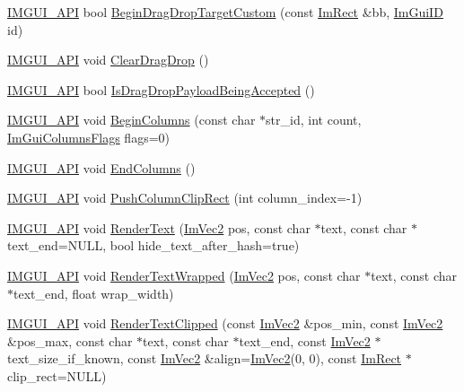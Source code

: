 \begin{DoxyCompactItemize}
\item 
\mbox{\hyperlink{imgui_8h_a43829975e84e45d1149597467a14bbf5}{I\+M\+G\+U\+I\+\_\+\+A\+PI}} bool \mbox{\hyperlink{namespace_im_gui_a929a420d3af29051a140d0f36addbcd2}{Begin\+Drag\+Drop\+Target\+Custom}} (const \mbox{\hyperlink{struct_im_rect}{Im\+Rect}} \&bb, \mbox{\hyperlink{imgui_8h_a1785c9b6f4e16406764a85f32582236f}{Im\+Gui\+ID}} id)
\item 
\mbox{\hyperlink{imgui_8h_a43829975e84e45d1149597467a14bbf5}{I\+M\+G\+U\+I\+\_\+\+A\+PI}} void \mbox{\hyperlink{namespace_im_gui_adae8f94649956a2a717c00dbf81a5df9}{Clear\+Drag\+Drop}} ()
\item 
\mbox{\hyperlink{imgui_8h_a43829975e84e45d1149597467a14bbf5}{I\+M\+G\+U\+I\+\_\+\+A\+PI}} bool \mbox{\hyperlink{namespace_im_gui_a673042a1ed3eeb3c19781faed83ad4a8}{Is\+Drag\+Drop\+Payload\+Being\+Accepted}} ()
\item 
\mbox{\hyperlink{imgui_8h_a43829975e84e45d1149597467a14bbf5}{I\+M\+G\+U\+I\+\_\+\+A\+PI}} void \mbox{\hyperlink{namespace_im_gui_a6992289cbdb087a690403e48340bfb23}{Begin\+Columns}} (const char $\ast$str\+\_\+id, int count, \mbox{\hyperlink{imgui_8h_a0edb3053546fcf6c5f7dcb7531c3a17a}{Im\+Gui\+Columns\+Flags}} flags=0)
\item 
\mbox{\hyperlink{imgui_8h_a43829975e84e45d1149597467a14bbf5}{I\+M\+G\+U\+I\+\_\+\+A\+PI}} void \mbox{\hyperlink{namespace_im_gui_af93bed3bce5475fe4d525d744f16aa20}{End\+Columns}} ()
\item 
\mbox{\hyperlink{imgui_8h_a43829975e84e45d1149597467a14bbf5}{I\+M\+G\+U\+I\+\_\+\+A\+PI}} void \mbox{\hyperlink{namespace_im_gui_abb20c9f8365cab62d9394ebb1dd5d769}{Push\+Column\+Clip\+Rect}} (int column\+\_\+index=-\/1)
\item 
\mbox{\hyperlink{imgui_8h_a43829975e84e45d1149597467a14bbf5}{I\+M\+G\+U\+I\+\_\+\+A\+PI}} void \mbox{\hyperlink{namespace_im_gui_a9971ce57f2a288ac3a12df886c5550d1}{Render\+Text}} (\mbox{\hyperlink{struct_im_vec2}{Im\+Vec2}} pos, const char $\ast$text, const char $\ast$text\+\_\+end=N\+U\+LL, bool hide\+\_\+text\+\_\+after\+\_\+hash=true)
\item 
\mbox{\hyperlink{imgui_8h_a43829975e84e45d1149597467a14bbf5}{I\+M\+G\+U\+I\+\_\+\+A\+PI}} void \mbox{\hyperlink{namespace_im_gui_aa483b40f6899e1b289b4bf6c2673d1d2}{Render\+Text\+Wrapped}} (\mbox{\hyperlink{struct_im_vec2}{Im\+Vec2}} pos, const char $\ast$text, const char $\ast$text\+\_\+end, float wrap\+\_\+width)
\item 
\mbox{\hyperlink{imgui_8h_a43829975e84e45d1149597467a14bbf5}{I\+M\+G\+U\+I\+\_\+\+A\+PI}} void \mbox{\hyperlink{namespace_im_gui_ab362eafae794c7364a6b96ea06f38eb9}{Render\+Text\+Clipped}} (const \mbox{\hyperlink{struct_im_vec2}{Im\+Vec2}} \&pos\+\_\+min, const \mbox{\hyperlink{struct_im_vec2}{Im\+Vec2}} \&pos\+\_\+max, const char $\ast$text, const char $\ast$text\+\_\+end, const \mbox{\hyperlink{struct_im_vec2}{Im\+Vec2}} $\ast$text\+\_\+size\+\_\+if\+\_\+known, const \mbox{\hyperlink{struct_im_vec2}{Im\+Vec2}} \&align=\mbox{\hyperlink{struct_im_vec2}{Im\+Vec2}}(0, 0), const \mbox{\hyperlink{struct_im_rect}{Im\+Rect}} $\ast$clip\+\_\+rect=N\+U\+LL)

\end{DoxyCompactItemize}
